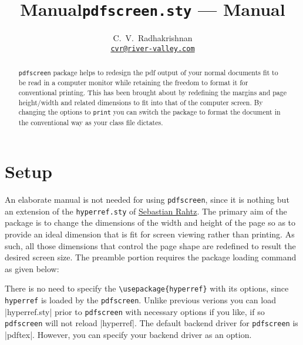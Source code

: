 \documentclass[a4paper]{article}
\def\pdfscreen{\texttt{\small\color{section1}pdfscreen}\xspace}
\begin{document}
\begin{screen}
\title{\color{section0}\Huge Manual}
\end{screen}

\begin{print}
\title{\Huge\texttt{pdfscreen.sty} --- Manual}
\end{print}

\author{\color{section1}\Large C.~V.~Radhakrishnan\\
        {\small\href{mailto:cvr@river-valley.com}
        {\color{section1}\texttt{cvr@river-valley.com}}}}
\maketitle
\begin{screen}
\vfill

\end{screen}

\begin{abstract}
\noindent \pdfscreen package helps to redesign the pdf output of your normal
documents fit to be read in a computer monitor while retaining the
freedom to format it for conventional printing. This has been brought
about by redefining the margins and page height/\allowbreak width and
related dimensions to fit into that of the computer screen. By
changing the options to \verb+print+ you can switch the package to
format the document in the conventional way as your class file
dictates.
\end{abstract}

\begin{print}
\tableofcontents
\end{print}
\begin{screen}

\vfill
\end{screen}

\section{Setup}\label{setup}

An elaborate manual is not needed for using  \pdfscreen, since
it is nothing but an extension of the \verb+hyperref.sty+ of
\href{mailto:sebastian.rahtz@oucs.ac.uk}{Sebastian Rahtz}.
The primary aim of the package is to change the dimensions of the width
and height of the page so as to provide an ideal dimension
that is fit for screen viewing rather than printing. As such, all those
dimensions that control the page shape are redefined to result the
desired screen size. The preamble portion requires the package loading
command as given below:
There is no need to specify the
\verb+\usepackage{hyperref}+ with its options, since \verb+hyperref+ is
loaded by the \pdfscreen. Unlike previous verions you can load
|hyperref.sty| prior to \pdfscreen with necessary options if you like,
if so \pdfscreen will not reload |hyperref|. The default backend driver
for \pdfscreen is |pdftex|. However, you can specify your backend
driver as an option.
\end{document}
